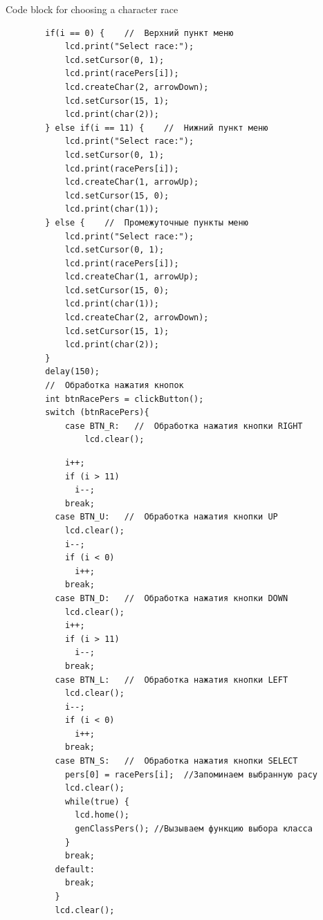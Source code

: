 \documentclass[12pt,a4paper,mathserif]{beamer}
\begin{document}
\begin{frame}[fragile]{{\small Code block for choosing a character race}}
    \begin{adjustbox}{width=\textwidth,height=\someheight,keepaspectratio}
    \begin{minipage}{1.1\linewidth}
    \begin{verbatim}
        if(i == 0) {    //  Верхний пункт меню
            lcd.print("Select race:");
            lcd.setCursor(0, 1);
            lcd.print(racePers[i]);
            lcd.createChar(2, arrowDown);
            lcd.setCursor(15, 1);
            lcd.print(char(2));
        } else if(i == 11) {    //  Нижний пункт меню
            lcd.print("Select race:");
            lcd.setCursor(0, 1);
            lcd.print(racePers[i]);
            lcd.createChar(1, arrowUp);
            lcd.setCursor(15, 0);
            lcd.print(char(1));
        } else {    //  Промежуточные пункты меню
            lcd.print("Select race:");
            lcd.setCursor(0, 1);
            lcd.print(racePers[i]);
            lcd.createChar(1, arrowUp);
            lcd.setCursor(15, 0);
            lcd.print(char(1));
            lcd.createChar(2, arrowDown);
            lcd.setCursor(15, 1);
            lcd.print(char(2));
        }
        delay(150);
        //  Обработка нажатия кнопок
        int btnRacePers = clickButton();
        switch (btnRacePers){
            case BTN_R:   //  Обработка нажатия кнопки RIGHT
                lcd.clear();
    \end{verbatim}
    \end{minipage}
    \hfill
    \begin{minipage}{1.1\linewidth}
    \begin{verbatim}
            i++;
            if (i > 11)
              i--;
            break;
          case BTN_U:   //  Обработка нажатия кнопки UP
            lcd.clear();
            i--;
            if (i < 0)
              i++;
            break;
          case BTN_D:   //  Обработка нажатия кнопки DOWN
            lcd.clear();
            i++;
            if (i > 11)
              i--;
            break;
          case BTN_L:   //  Обработка нажатия кнопки LEFT
            lcd.clear();
            i--;
            if (i < 0)
              i++;
            break;
          case BTN_S:   //  Обработка нажатия кнопки SELECT
            pers[0] = racePers[i];  //Запоминаем выбранную расу
            lcd.clear();
            while(true) {
              lcd.home();
              genClassPers(); //Вызываем функцию выбора класса
            }
            break;
          default:
            break;
          }
          lcd.clear();
    \end{verbatim}
    \end{minipage}
    \end{adjustbox}
\end{frame}
\end{document}
